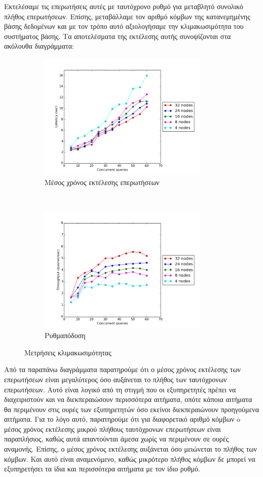 Εκτελέσαμε τις επερωτήσεις αυτές με ταυτόχρονο ρυθμό για μεταβλητό συνολικό πλήθος \linebreak επερωτήσεων. Επίσης, μεταβάλλαμε τον αριθμό κόμβων της κατανεμημένης βάσης 
δεδομένων και με τον τρόπο αυτό αξιολογήσαμε την κλιμακωσιμότητα του συστήματος βάσης. Τα αποτελέσματα της εκτέλεσης αυτής συνοψίζονται στα ακόλουθα 
διαγράμματα:

\begin{figure}[H]
    \centering
    \begin{subfigure}[t]{0.5\textwidth}
        \centering
        \includegraphics[height=2.4in]{figures/scalability_latency.png}
        \caption{Μέσος χρόνος εκτέλεσης επερωτήσεων}
    \end{subfigure}%
    ~ 
    \begin{subfigure}[t]{0.5\textwidth}
        \centering
        \includegraphics[height=2.4in]{figures/scalability_throughput.png}
        \caption{Ρυθμαπόδοση}
    \end{subfigure}
    \caption{Μετρήσεις κλιμακωσιμότητας}
\end{figure}

Από τα παραπάνω διαγράμματα παρατηρούμε ότι ο μέσος χρόνος εκτέλεσης των επερωτήσεων είναι μεγαλύτερος όσο αυξάνεται το 
πλήθος των ταυτόχρονων επερωτήσεων. Αυτό είναι λογικό από τη στιγμή που οι εξυπηρετητές πρέπει να διαχειριστούν και να διεκπεραιώσουν περισσότερα αιτήματα, οπότε 
κάποια αιτήματα θα περιμένουν στις ουρές των εξυπηρετητών όσο εκείνοι \linebreak διεκπεραιώνουν προηγούμενα αιτήματα. Για το λόγο αυτό, 
παρατηρούμε ότι για διαφορετικό αριθμό κόμβων o μέσος χρόνος εκτέλεσης μικρού πλήθους ταυτόχρονων επερωτήσεων είναι παραπλήσιος, καθώς αυτά απαντούνται 
άμεσα χωρίς να περιμένουν σε ουρές αναμονής. 
Επίσης, ο μέσος χρόνος εκτέλεσης αυξάνεται όσο μειώνεται το πλήθος των κόμβων. Και αυτό είναι αναμενόμενο, καθώς μικρότερο πλήθος κόμβων δε μπορεί να εξυπηρετήσει τα ίδια και 
περισσότερα αιτήματα με τον ίδιο ρυθμό.

